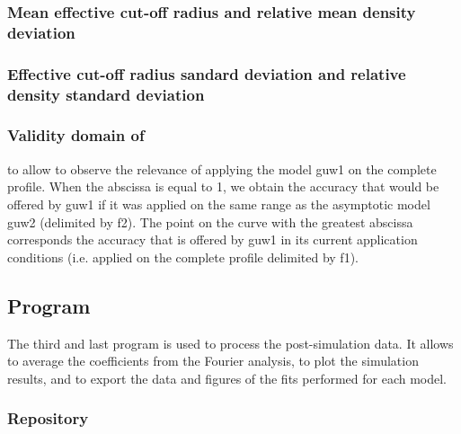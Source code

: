 \bigskip

\newpage

{\renewcommand{\arraystretch}{1.6}

\subsubsection{Mean effective cut-off radius and relative mean density deviation}





\newpage

\subsubsection{Effective cut-off radius sandard deviation and relative density standard deviation}





\newpage

\subsubsection{Validity domain of }



\newpage

 to  allow to observe the relevance of applying the model \gls{guw1} on the complete profile.
When the abscissa is equal to 1, we obtain the accuracy that would be offered by \gls{guw1} if it was applied on the same range as the asymptotic model \gls{guw2} (delimited by \gls{f2}).
The point on the curve with the greatest abscissa corresponds the accuracy that is offered by \gls{guw1} in its current application conditions (i.e. applied on the complete profile delimited by \gls{f1}).

\subsection{Program}

The third and last program is used to process the post-simulation data.
It allows to average the coefficients from the Fourier analysis, to plot the simulation results, and to export the data and figures of the fits performed for each model.

\subsubsection{Repository}

}
